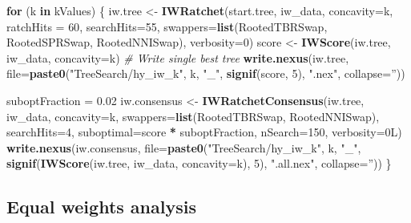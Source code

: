 \documentclass[]{book}
\newenvironment{Shaded}{\begin{snugshade}}{\end{snugshade}}
\newcommand{\KeywordTok}[1]{\textcolor[rgb]{0.13,0.29,0.53}{\textbf{#1}}}
\newcommand{\DataTypeTok}[1]{\textcolor[rgb]{0.13,0.29,0.53}{#1}}
\newcommand{\DecValTok}[1]{\textcolor[rgb]{0.00,0.00,0.81}{#1}}
\newcommand{\FloatTok}[1]{\textcolor[rgb]{0.00,0.00,0.81}{#1}}
\newcommand{\StringTok}[1]{\textcolor[rgb]{0.31,0.60,0.02}{#1}}
\newcommand{\CommentTok}[1]{\textcolor[rgb]{0.56,0.35,0.01}{\textit{#1}}}
\newcommand{\ControlFlowTok}[1]{\textcolor[rgb]{0.13,0.29,0.53}{\textbf{#1}}}
\newcommand{\OperatorTok}[1]{\textcolor[rgb]{0.81,0.36,0.00}{\textbf{#1}}}
\newcommand{\NormalTok}[1]{#1}
\theoremstyle{definition}
\theoremstyle{definition}
\theoremstyle{definition}
\theoremstyle{remark}
\begin{document}
\begin{Shaded}
\begin{Highlighting}[]
\ControlFlowTok{for}\NormalTok{ (k }\ControlFlowTok{in}\NormalTok{ kValues) \{}
\NormalTok{  iw.tree <-}\StringTok{ }\KeywordTok{IWRatchet}\NormalTok{(start.tree, iw_data, }\DataTypeTok{concavity=}\NormalTok{k,}
                       \DataTypeTok{ratchHits =} \DecValTok{60}\NormalTok{, }\DataTypeTok{searchHits=}\DecValTok{55}\NormalTok{,}
                       \DataTypeTok{swappers=}\KeywordTok{list}\NormalTok{(RootedTBRSwap, RootedSPRSwap, RootedNNISwap),}
                       \DataTypeTok{verbosity=}\DecValTok{0}\NormalTok{)}
\NormalTok{  score <-}\StringTok{ }\KeywordTok{IWScore}\NormalTok{(iw.tree, iw_data, }\DataTypeTok{concavity=}\NormalTok{k)}
  \CommentTok{# Write single best tree}
  \KeywordTok{write.nexus}\NormalTok{(iw.tree, }\DataTypeTok{file=}\KeywordTok{paste0}\NormalTok{(}\StringTok{"TreeSearch/hy_iw_k"}\NormalTok{, k, }\StringTok{"_"}\NormalTok{, }\KeywordTok{signif}\NormalTok{(score, }\DecValTok{5}\NormalTok{), }\StringTok{".nex"}\NormalTok{, }\DataTypeTok{collapse=}\StringTok{''}\NormalTok{))}

\NormalTok{  suboptFraction =}\StringTok{ }\FloatTok{0.02}
\NormalTok{  iw.consensus <-}\StringTok{ }\KeywordTok{IWRatchetConsensus}\NormalTok{(iw.tree, iw_data, }\DataTypeTok{concavity=}\NormalTok{k,}
                  \DataTypeTok{swappers=}\KeywordTok{list}\NormalTok{(RootedTBRSwap, RootedNNISwap),}
                  \DataTypeTok{searchHits=}\DecValTok{4}\NormalTok{,}
                  \DataTypeTok{suboptimal=}\NormalTok{score }\OperatorTok{*}\StringTok{ }\NormalTok{suboptFraction,}
                  \DataTypeTok{nSearch=}\DecValTok{150}\NormalTok{, }\DataTypeTok{verbosity=}\NormalTok{0L)}
  \KeywordTok{write.nexus}\NormalTok{(iw.consensus, }\DataTypeTok{file=}\KeywordTok{paste0}\NormalTok{(}\StringTok{"TreeSearch/hy_iw_k"}\NormalTok{, k, }\StringTok{"_"}\NormalTok{, }\KeywordTok{signif}\NormalTok{(}\KeywordTok{IWScore}\NormalTok{(iw.tree, iw_data, }\DataTypeTok{concavity=}\NormalTok{k), }\DecValTok{5}\NormalTok{), }\StringTok{".all.nex"}\NormalTok{, }\DataTypeTok{collapse=}\StringTok{''}\NormalTok{))}
\NormalTok{\}}
\end{Highlighting}
\end{Shaded}

\hypertarget{equal-weights-analysis}{%
\subsection{Equal weights analysis}\label{equal-weights-analysis}}
\end{document}
